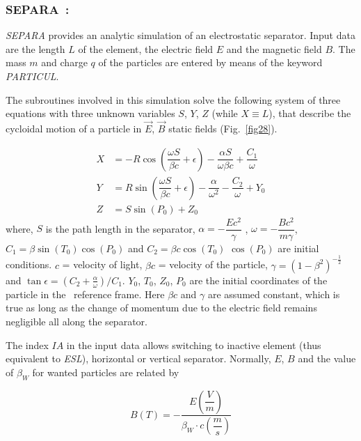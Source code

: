 \newpage

\subsubsection*{SEPARA~: \SEPARATitl}\label{SEPARA} 

\textsl{SEPARA}  provides an analytic simulation of an electrostatic separator. 
Input data are the length $ L $ of the element, the electric field $ E $ and
the magnetic field $ B $. The mass $ m $ and charge $ q $ of the particles are
entered by means of the keyword \textsl{PARTICUL}.  
\medskip

\noindent The subroutines involved in this simulation solve the following
system of three equations with three unknown variables $ S$, $Y$, $Z $ (while  $ X\equiv L $), that 
describe the cycloidal motion of a particle in $ \vec  E$,  $ \vec  B $ static
fields (Fig.~\ref{fig28}).   

\begin{align*}
	X &   =   -R  \cos \left( \dfrac{\omega S }{ \beta c} + \epsilon \right) 
	         -  \dfrac{\alpha S }{ \omega\beta c} + \dfrac{C_1 }{ \omega} \\
	Y &   =     R \sin  \left(\dfrac{\omega S }{ \beta c} + \epsilon \right) - 
	         \dfrac{\alpha }{ \omega^ 2} - \dfrac{C_2 }{ \omega}  + Y_0  \\
	Z &   =  S \sin (P_0)+Z_0   
\end{align*}
%
 where, $ S $ is the path length in the separator, $\alpha =-\dfrac{Ec^2 }{ \gamma}$ ,
   $   \omega =-\dfrac{Bc^2 }{m\gamma}$, $   C_1=\beta \sin (T_0) \cos (P_0) $ 
and $ C_2=\beta c  \cos (T_0) $ $ \cos (P_0) $ are initial conditions. 
$c$ = velocity of light, $ \beta c$ = velocity of the particle,  
$ \gamma =(1-\beta^ 2)^{-\frac{1 }{ 2}} $ 
and  $\tan \epsilon  =   (C_2+ \frac{\alpha}{\omega})/C_1 $.   $ Y_0$,   $ T_0$,  
$Z_0$,  $ P_0 $ are the initial 
coordinates of the particle in the \zgou\ reference  frame.  Here 
$\beta c $ and $\gamma$ are assumed constant, which is true as long as the change of momentum
due to the electric field remains negligible all along the separator.  
\medskip

\noindent The index $IA$ in the input data allows switching to inactive
element (thus equivalent to \textsl{ESL}), horizontal or vertical separator.  
Normally, $ E$,  $B $ and the value of $ \beta_W $ for wanted particles are related by 

$$ B(T) = - \dfrac{E\left(\dfrac{V }{ m}\right) }{ \beta_ W\cdot c\left(\dfrac{m }{ s}\right)} $$

